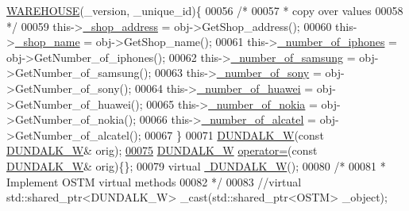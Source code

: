 \begin{DoxyCode}
      \hyperlink{class_w_a_r_e_h_o_u_s_e}{WAREHOUSE}(\_version, \_unique\_id)\{
00056         \textcolor{comment}{/*}
00057 \textcolor{comment}{         * copy over values}
00058 \textcolor{comment}{         */}
00059         this->\hyperlink{class_d_u_n_d_a_l_k___w_a84ef96f22ec520afc66bb26b0d264475_a84ef96f22ec520afc66bb26b0d264475}{\_shop\_address} = obj->GetShop\_address();
00060         this->\hyperlink{class_d_u_n_d_a_l_k___w_ac9018980d31ba581cd83b07df0b171e2_ac9018980d31ba581cd83b07df0b171e2}{\_shop\_name} = obj->GetShop\_name();
00061         this->\hyperlink{class_d_u_n_d_a_l_k___w_a82b528f661644166d93a5209524b4543_a82b528f661644166d93a5209524b4543}{\_number\_of\_iphones} = obj->GetNumber\_of\_iphones();
00062         this->\hyperlink{class_d_u_n_d_a_l_k___w_afec98ddc022c03aaaaa2848e5ca7cfb3_afec98ddc022c03aaaaa2848e5ca7cfb3}{\_number\_of\_samsung} = obj->GetNumber\_of\_samsung();
00063         this->\hyperlink{class_d_u_n_d_a_l_k___w_a9a40b513a6d4153a9a0f37ce47429369_a9a40b513a6d4153a9a0f37ce47429369}{\_number\_of\_sony} = obj->GetNumber\_of\_sony();
00064         this->\hyperlink{class_d_u_n_d_a_l_k___w_a84781068676dee44cb4654706d8fec51_a84781068676dee44cb4654706d8fec51}{\_number\_of\_huawei} = obj->GetNumber\_of\_huawei();
00065         this->\hyperlink{class_d_u_n_d_a_l_k___w_a8e794ecf0c55b5606a8f4a0ab214c657_a8e794ecf0c55b5606a8f4a0ab214c657}{\_number\_of\_nokia} = obj->GetNumber\_of\_nokia();
00066         this->\hyperlink{class_d_u_n_d_a_l_k___w_a67a471ec2d409a309ebc179ff4d789bc_a67a471ec2d409a309ebc179ff4d789bc}{\_number\_of\_alcatel} = obj->GetNumber\_of\_alcatel();
00067     \}
00071     \hyperlink{class_d_u_n_d_a_l_k___w_ad459a77b4f3e0aaebb3d178eb014a77f_ad459a77b4f3e0aaebb3d178eb014a77f}{DUNDALK\_W}(\textcolor{keyword}{const} \hyperlink{class_d_u_n_d_a_l_k___w}{DUNDALK\_W}& orig);
\hypertarget{_d_u_n_d_a_l_k___w_8h_source.tex_l00075}{}\hyperlink{class_d_u_n_d_a_l_k___w_a63e33d9aa73d944f92928e90566874b9_a63e33d9aa73d944f92928e90566874b9}{00075}     \hyperlink{class_d_u_n_d_a_l_k___w}{DUNDALK\_W} \hyperlink{class_d_u_n_d_a_l_k___w_a63e33d9aa73d944f92928e90566874b9_a63e33d9aa73d944f92928e90566874b9}{operator=}(\textcolor{keyword}{const} \hyperlink{class_d_u_n_d_a_l_k___w}{DUNDALK\_W}& orig)\{\};
00079     \textcolor{keyword}{virtual} \hyperlink{class_d_u_n_d_a_l_k___w_a91d26f413bf5bc2d089b77036f7fbfa9_a91d26f413bf5bc2d089b77036f7fbfa9}{~DUNDALK\_W}();
00080     \textcolor{comment}{/*}
00081 \textcolor{comment}{     * Implement OSTM virtual methods}
00082 \textcolor{comment}{     */}
00083     \textcolor{comment}{//virtual std::shared\_ptr<DUNDALK\_W> \_cast(std::shared\_ptr<OSTM> \_object);}

\end{DoxyCode}
